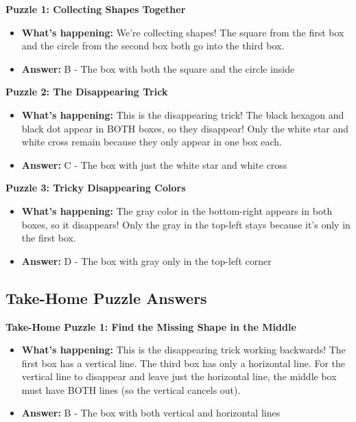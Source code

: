 \documentclass{article}
\begin{document}
\textbf{Puzzle 1: Collecting Shapes Together}
\begin{itemize}
    \item \textbf{What's happening:} We're collecting shapes! The square from the first box and the circle from the second box both go into the third box.
    \item \textbf{Answer:} B - The box with both the square and the circle inside
\end{itemize}

\vspace{0.3cm}
\textbf{Puzzle 2: The Disappearing Trick}
\begin{itemize}
    \item \textbf{What's happening:} This is the disappearing trick! The black hexagon and black dot appear in BOTH boxes, so they disappear! Only the white star and white cross remain because they only appear in one box each.
    \item \textbf{Answer:} C - The box with just the white star and white cross
\end{itemize}

\vspace{0.3cm}
\textbf{Puzzle 3: Tricky Disappearing Colors}
\begin{itemize}
    \item \textbf{What's happening:} The gray color in the bottom-right appears in both boxes, so it disappears! Only the gray in the top-left stays because it's only in the first box.
    \item \textbf{Answer:} D - The box with gray only in the top-left corner
\end{itemize}

\subsection*{Take-Home Puzzle Answers}

\textbf{Take-Home Puzzle 1: Find the Missing Shape in the Middle}
\begin{itemize}
    \item \textbf{What's happening:} This is the disappearing trick working backwards! The first box has a vertical line. The third box has only a horizontal line. For the vertical line to disappear and leave just the horizontal line, the middle box must have BOTH lines (so the vertical cancels out).
    \item \textbf{Answer:} B - The box with both vertical and horizontal lines
\end{itemize}
\end{document}

